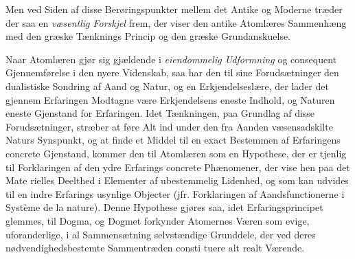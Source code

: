 Men ved Siden af disse Berøringspunkter mellem det
Antike og Moderne træder der saa en \emph{væsentlig Forskjel}
frem, der viser den antike Atomlæres Sammenhæng med den
græske Tænknings Princip og den græske Grundanskuelse.

Naar Atomlæren gjør sig gjældende i \emph{eiendommelig
Udformning} og consequent Gjennemførelse i den nyere
Videnskab, saa har den til sine Forudsætninger den dualistiske
Sondring af Aand og Natur, og en Erkjendelseslære, der lader
det gjennem Erfaringen Modtagne være Erkjendelsens eneste
Indhold, og Naturen eneste Gjenstand for Erfaringen. Idet
Tænkningen, paa Grundlag af disse Forudsætninger, stræber
at føre Alt ind under den fra Aanden væsensadskilte Naturs
Synspunkt, og at finde et Middel til en exact Bestemmen af
Erfaringens concrete Gjenstand, kommer den til Atomlæren
som en Hypothese, der er tjenlig til Forklaringen af den ydre
 \setcounter{footnote}{0}
Erfarings concrete Phænomener, der vise hen paa det Mate\-%
rielles Deelthed i Elementer af ubestemmelig Lidenhed, og
som kan udvides til en indre Erfarings usynlige Objecter (jfr.
Forklaringen af Aandsfunctionerne i Système de la nature).
Denne Hypothese gjøres saa, idet Erfaringsprincipet glemmes,
til Dogma, og Dogmet forkynder Atomernes Væren som evige,
uforanderlige, i al Sammensætning selvstændige Grunddele,
der ved deres nødvendighedsbestemte Sammentræden consti\-%
tuere alt realt Værende.

